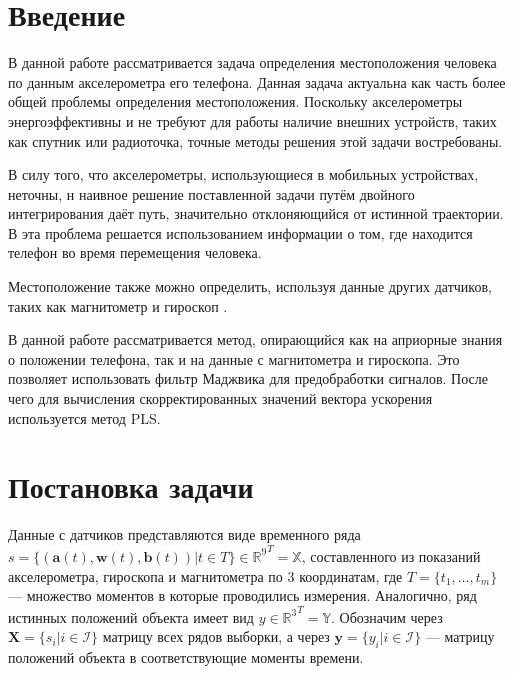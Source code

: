 \documentclass[12pt,twoside]{article}
\title
    {Определение местоположения по сигналам акселерометра}
\author
    {Макаров~М.\,В.} %
\begin{document}
\maketitle

\section{Введение}
В данной работе рассматривается задача определения местоположения человека по данным акселерометра его телефона. Данная задача актуальна как часть
более общей проблемы определения местоположения. Поскольку акселерометры энергоэффективны и не требуют для работы наличие внешних устройств, таких как спутник или радиоточка, точные методы решения этой задачи востребованы.
    
В силу того, что акселерометры, использующиеся в мобильных устройствах, неточны, н
наивное решение поставленной задачи путём двойного интегрирования даёт путь, значительно отклоняющийся от истинной траектории.
В \cite{journals/corr/abs-1712-09004} эта проблема решается использованием информации о том, где находится телефон во время 
перемещения человека.

Местоположение также можно определить, используя данные других датчиков, таких как магнитометр \cite{6987239} и гироскоп \cite{s18051391}.

В данной работе рассматривается метод, опирающийся как на априорные знания о положении телефона, так и на данные с магнитометра и гироскопа.
Это позволяет использовать фильтр Маджвика для предобработки сигналов. После чего для вычисления скорректированных значений вектора ускорения
используется метод PLS.




\section{Постановка задачи}
Данные с датчиков представляются виде временного ряда 
$s = \{ (\mathbf{a}(t), \mathbf{w}(t), \mathbf{b}(t)) | t \in T \} \in {\mathbb{R}^{9}}^T = \mathbb{X}$, 
составленного из показаний акселерометра, гироскопа и магнитометра по 3 координатам, 
где 
$T = \{ t_1, \ldots, t_m \}$ --- множество моментов в которые проводились измерения. 
Аналогично, ряд истинных положений объекта имеет вид $y \in {\mathbb{R}^{3}}^T = \mathbb{Y}$.
Обозначим через $\mathbf{X} = \{ s_i | i \in \mathcal{I} \} $ матрицу всех рядов выборки, 
а через $\mathbf{y} = \{ y_i | i \in \mathcal{I} \}$ --- матрицу положений объекта в соответствующие моменты времени.
\end{document}
